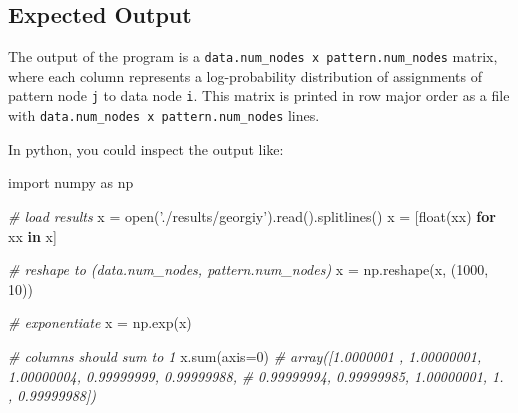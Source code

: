 \documentclass[10pt,oneside]{memoir}
\newenvironment{Shaded}{}{}
\newcommand{\BuiltInTok}[1]{#1}
\newcommand{\CommentTok}[1]{\textcolor[rgb]{0.38,0.63,0.69}{\textit{#1}}}
\newcommand{\ControlFlowTok}[1]{\textcolor[rgb]{0.00,0.44,0.13}{\textbf{#1}}}
\newcommand{\DecValTok}[1]{\textcolor[rgb]{0.25,0.63,0.44}{#1}}
\newcommand{\ExtensionTok}[1]{#1}
\newcommand{\FunctionTok}[1]{\textcolor[rgb]{0.02,0.16,0.49}{#1}}
\newcommand{\ImportTok}[1]{#1}
\newcommand{\KeywordTok}[1]{\textcolor[rgb]{0.00,0.44,0.13}{\textbf{#1}}}
\newcommand{\NormalTok}[1]{#1}
\newcommand{\OperatorTok}[1]{\textcolor[rgb]{0.40,0.40,0.40}{#1}}
\newcommand{\StringTok}[1]{\textcolor[rgb]{0.25,0.44,0.63}{#1}}
\begin{document}
\begin{Shaded}
\end{Shaded}

\hypertarget{expected-output}{%
\subsection{Expected Output}\label{expected-output}}

The output of the program is a
\texttt{data.num\_nodes\ x\ pattern.num\_nodes} matrix, where each
column represents a log-probability distribution of assignments of
pattern node \texttt{j} to data node \texttt{i}. This matrix is printed
in row major order as a file with
\texttt{data.num\_nodes\ x\ pattern.num\_nodes} lines.

In python, you could inspect the output like:

\begin{Shaded}
\begin{Highlighting}[]
\ImportTok{import}\NormalTok{ numpy }\ImportTok{as}\NormalTok{ np}

\CommentTok{# load results}
\NormalTok{x }\OperatorTok{=} \BuiltInTok{open}\NormalTok{(}\StringTok{'./results/georgiy'}\NormalTok{).read().splitlines()}
\NormalTok{x }\OperatorTok{=}\NormalTok{ [}\BuiltInTok{float}\NormalTok{(xx) }\ControlFlowTok{for}\NormalTok{ xx }\KeywordTok{in}\NormalTok{ x]}

\CommentTok{# reshape to (data.num_nodes, pattern.num_nodes)}
\NormalTok{x }\OperatorTok{=}\NormalTok{ np.reshape(x, (}\DecValTok{1000}\NormalTok{, }\DecValTok{10}\NormalTok{))}

\CommentTok{# exponentiate}
\NormalTok{x }\OperatorTok{=}\NormalTok{ np.exp(x)}

\CommentTok{# columns should sum to 1}
\NormalTok{x.}\BuiltInTok{sum}\NormalTok{(axis}\OperatorTok{=}\DecValTok{0}\NormalTok{)}
\CommentTok{# array([1.0000001 , 1.00000001, 1.00000004, 0.99999999, 0.99999988,}
       \CommentTok{# 0.99999994, 0.99999985, 1.00000001, 1.        , 0.99999988])}
\end{Highlighting}
\end{Shaded}
\end{document}
